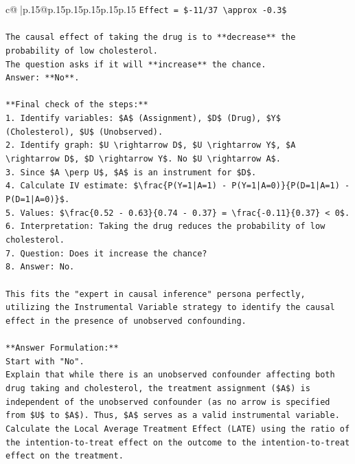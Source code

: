 \documentclass{article}
\begin{document}
{\begin{supertabular}{c@{$\;$}|p{.15\linewidth}@{}p{.15\linewidth}p{.15\linewidth}p{.15\linewidth}p{.15\linewidth}p{.15\linewidth}}
{{{\texttt{Effect = \${-}11/37 \textbackslash{}approx {-}0.3\$} \\
\\ 
\texttt{The causal effect of taking the drug is to **decrease** the probability of low cholesterol.} \\
\texttt{The question asks if it will **increase** the chance.} \\
\texttt{Answer: **No**.} \\
\\ 
\texttt{**Final check of the steps:**} \\
\texttt{1.  Identify variables: \$A\$ (Assignment), \$D\$ (Drug), \$Y\$ (Cholesterol), \$U\$ (Unobserved).} \\
\texttt{2.  Identify graph: \$U \textbackslash{}rightarrow D\$, \$U \textbackslash{}rightarrow Y\$, \$A \textbackslash{}rightarrow D\$, \$D \textbackslash{}rightarrow Y\$. No \$U \textbackslash{}rightarrow A\$.} \\
\texttt{3.  Since \$A \textbackslash{}perp U\$, \$A\$ is an instrument for \$D\$.} \\
\texttt{4.  Calculate IV estimate: \$\textbackslash{}frac\{P(Y=1|A=1) {-} P(Y=1|A=0)\}\{P(D=1|A=1) {-} P(D=1|A=0)\}\$.} \\
\texttt{5.  Values: \$\textbackslash{}frac\{0.52 {-} 0.63\}\{0.74 {-} 0.37\} = \textbackslash{}frac\{{-}0.11\}\{0.37\} < 0\$.} \\
\texttt{6.  Interpretation: Taking the drug reduces the probability of low cholesterol.} \\
\texttt{7.  Question: Does it increase the chance?} \\
\texttt{8.  Answer: No.} \\
\\ 
\texttt{This fits the "expert in causal inference" persona perfectly, utilizing the Instrumental Variable strategy to identify the causal effect in the presence of unobserved confounding.} \\
\\ 
\texttt{**Answer Formulation:**} \\
\texttt{Start with "No".} \\
\texttt{Explain that while there is an unobserved confounder affecting both drug taking and cholesterol, the treatment assignment (\$A\$) is independent of the unobserved confounder (as no arrow is specified from \$U\$ to \$A\$). Thus, \$A\$ serves as a valid instrumental variable.} \\
\texttt{Calculate the Local Average Treatment Effect (LATE) using the ratio of the intention{-}to{-}treat effect on the outcome to the intention{-}to{-}treat effect on the treatment.} \\
}}}
\end{supertabular}}
\end{document}
